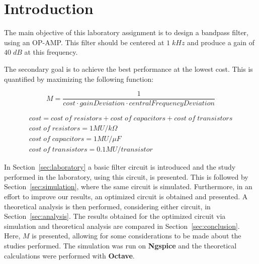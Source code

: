 \newpage

\section{Introduction}
\label{sec:introduction}

The main objective of this laboratory assignment is to design a bandpass filter, using an OP-AMP. This filter should be centered at $1\;kHz$ and produce a gain of $40\;dB$ at this frequency.

The secondary goal is to achieve the best performance at the lowest cost. This is quantified by maximizing the following function:

\begin{equation}
  M = \frac{1}{cost \cdot gainDeviation \cdot centralFrequencyDeviation}
\end{equation}

\begin{gather*}
  cost = cost\;of\;resistors + cost\;of\;capacitors + cost\;of\;transistors \\
  cost\;of\;resistors = 1 MU/k\Omega \\
  cost\;of\;capacitors = 1 MU/\mu F \\
  cost\;of\;transistors = 0.1 MU/transistor
\end{gather*}

In Section~\ref{sec:laboratory} a basic filter circuit is introduced and the study performed in the laboratory, using this circuit, is presented. This is followed by Section~\ref{sec:simulation}, where the same circuit is simulated. Furthermore, in an effort to improve our results, an optimized circuit is obtained and presented. A theoretical analysis is then performed, considering either circuit, in Section~\ref{sec:analysis}. The results obtained for the optimized circuit via simulation and theoretical analysis are compared in Section~\ref{sec:conclusion}. Here, $M$ is presented, allowing for some considerations to be made about the studies performed. The simulation was run on {\bf Ngspice} and the theoretical calculations were performed with {\bf Octave}.

